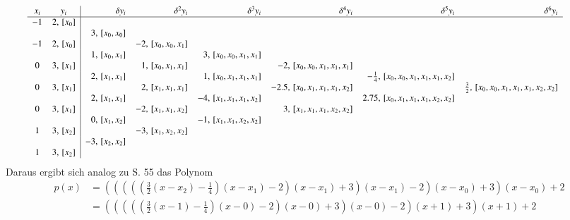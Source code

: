 \documentclass[10pt,a4paper]{article}
\begin{document}
	\begin{align*} \hspace{-1cm} {\small
	\begin{array}{cc|rrrrrr}
		x_i &    y_i     &       \delta y_i &          \delta^2 y_i &                \delta^3y_i &                       \delta^4y_i &                            \delta^5y_i &                                 \delta^6y_i \\ \hline
		-1  & 2,\, [x_0] &                  &  \\
		    &            &  3,\, [x_0, x_0] &  \\
		-1  & 2,\, [x_0] &                  & -2,\, [x_0, x_0, x_1] &  \\
		    &            &  1,\, [x_0, x_1] &                       &  3,\, [x_0, x_0, x_1, x_1] &  \\
		 0  & 3,\, [x_1] &                  &  1,\, [x_0, x_1, x_1] &                            &   -2,\, [x_0, x_0, x_1, x_1, x_1] &  \\
		    &            &  2,\, [x_1, x_1] &                       &  1,\, [x_0, x_1, x_1, x_1] &                                   & -\frac{1}{4},\, [x_0, x_0, x_1, x_1, x_1, x_2] &  \\
		 0  & 3,\, [x_1] &                  &  2,\, [x_1, x_1, x_1] &                            & -2.5,\, [x_0, x_1, x_1, x_1, x_2] & & \frac{3}{2},\, [x_0, x_0, x_1, x_1, x_1, x_2, x_2] \\
		    &            &  2,\, [x_1, x_1] &                       & -4,\, [x_1, x_1, x_1, x_2] &                                   & 2.75,\, [x_0, x_1, x_1, x_1, x_2, x_2] &  \\
		 0  & 3,\, [x_1] &                  & -2,\, [x_1, x_1, x_2] &                            &    3,\, [x_1, x_1, x_1, x_2, x_2] &  \\
		    &            &  0,\, [x_1, x_2] &                       & -1,\, [x_1, x_1, x_2, x_2] &  \\
		 1  & 3,\, [x_2] &                  & -3,\, [x_1, x_2, x_2] &  \\
		    &            & -3,\, [x_2, x_2] &  \\
		 1  & 3,\, [x_2] &                  &
	\end{array} }
	\end{align*}
	Daraus ergibt sich analog zu S. 55 das Polynom
	\begin{align*}
		p(x) &= (((((\frac{3}{2}(x-x_2)-\frac{1}{4})(x-x_1)-2)(x-x_1)+3)(x-x_1)-2)(x-x_0)+3)(x-x_0)+2 \\
			 &= (((((\frac{3}{2}(x-1)-\frac{1}{4})(x-0)-2)(x-0)+3)(x-0)-2)(x+1)+3)(x+1)+2
	\end{align*}
\end{document}
